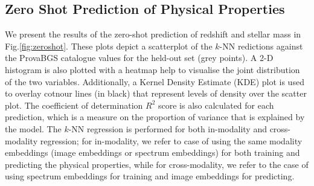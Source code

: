 \documentclass[a4paper,12pt]{article}
\begin{document}



\subsection{Zero Shot Prediction of Physical Properties}
We present the results of the zero-shot prediction of redshift and stellar mass in Fig.\ref{fig:zeroshot}. These plots depict a scatterplot of the $k$-NN redictions against the ProvaBGS catalogue values for the held-out set (grey points). A 2-D histogram is also plotted with a heatmap help to visualise the joint distribution of the two variables. Additionally, a Kernel Density Estimate (KDE) plot is used to overlay cotnour lines (in black) that represent levels of density over the scatter plot. The coefficient of determination $R^2$ score is also calculated for each prediction, which is a measure on the proportion of variance that is explained by the model. The $k$-NN regression is performed for both in-modality and cross-modality regression; for in-modality, we refer to case of using the same modality embeddings (image embeddings or spectrum embeddings) for both training and predicting the physical properties, while for cross-modality, we refer to the case of using spectrum embeddings for training and image embeddings for predicting. 
\end{document}
